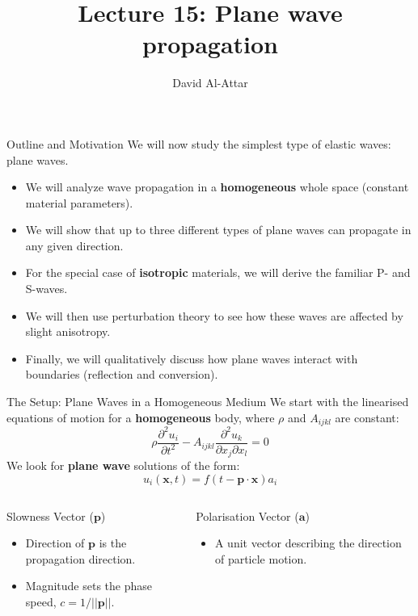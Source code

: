\documentclass{beamer}
\title[Lecture 15: Plane wave propagation]{Lecture 15: Plane wave propagation}
\author{David Al-Attar}
\institute{Michaelmas term 2024}
\date{}
\begin{document}

\begin{frame}
    \titlepage
\end{frame}

\begin{frame}{Outline and Motivation}
    We will now study the simplest type of elastic waves: plane waves.
    \begin{itemize}
        \item We will analyze wave propagation in a \textbf{homogeneous} whole space (constant material parameters).
        \pause
        \item We will show that up to three different types of plane waves can propagate in any given direction.
        \pause
        \item For the special case of \textbf{isotropic} materials, we will derive the familiar P- and S-waves.
        \pause
        \item We will then use perturbation theory to see how these waves are affected by slight anisotropy.
        \pause
        \item Finally, we will qualitatively discuss how plane waves interact with boundaries (reflection and conversion).
    \end{itemize}
\end{frame}


\begin{frame}{The Setup: Plane Waves in a Homogeneous Medium}
    We start with the linearised equations of motion for a \textbf{homogeneous} body, where $\rho$ and $A_{ijkl}$ are constant:
    $$ \rho\frac{\partial^{2}u_{i}}{\partial t^{2}} - A_{ijkl}\frac{\partial^2 u_{k}}{\partial x_{j}\partial x_{l}}=0 $$
    \pause
    We look for \textbf{plane wave} solutions of the form:
    $$ u_{i}(\mathbf{x},t)=f(t-\mathbf{p}\cdot\mathbf{x})a_{i} $$
    \pause
    \begin{columns}
        \begin{block}{Slowness Vector ($\mathbf{p}$)}
            \begin{itemize}
                \item Direction of $\mathbf{p}$ is the propagation direction.
                \item Magnitude sets the phase speed, $c = 1/||\mathbf{p}||$.
            \end{itemize}
        \end{block}
        \begin{block}{Polarisation Vector ($\mathbf{a}$)}
            \begin{itemize}
                \item A unit vector describing the direction of particle motion.
            \end{itemize}
        \end{block}
    \end{columns}
\end{frame}
\end{document}
